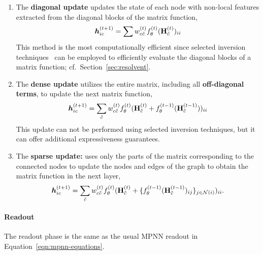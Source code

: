 \documentclass{article} \usepackage{iclr2024_conference,times}
\begin{document}
\begin{enumerate}[leftmargin=1cm]
    \item The \textbf{diagonal update} updates the state of each node with non-local features extracted from the diagonal blocks of the matrix function, 
    \begin{equation}
    \label{eq:update}
        \bm{h}^{(t+1)}_{ic} = \sum w_{c\tilde{c}}^{(t)} f_{\theta}^{(t)}({\bf H}^{(t)}_{\tilde{c}})_{ii}
    \end{equation}
This method is the most computationally efficient since selected inversion techniques~\citep{pexsi_CMS2009} can be employed to efficiently evaluate the diagonal blocks of a matrix function; cf.~Section~\ref{sec:resolvent}. 
    \item The \textbf{dense update} utilizes the entire matrix, including all \textbf{off-diagonal terms}, to update the next matrix function, 
\begin{equation}
    \label{eq:update-full}
        \bm{h}^{(t+1)}_{ic} = \sum_{\tilde{c}} w_{c\tilde{c}}^{(t)} f_{\theta}^{(t)}({\bf H}^{(t)}_{\tilde{c}} + f_{\theta}^{(t-1)}({\bf H}^{(t-1)}_{\tilde{c}}))_{ii}
    \end{equation}
This update can not be performed using selected inversion techniques, but it can offer additional expressiveness guarantees.
    \item The \textbf{sparse update:} uses only the parts of the matrix corresponding to the connected nodes to update the nodes and edges of the graph to obtain the matrix function in the next layer, 
    \begin{equation}
    \label{eq:update-sparse}
        \bm{h}^{(t+1)}_{ic} = \sum_{\tilde{c}} w_{c\tilde{c}}^{(t)} f_{\theta}^{(t)}({\bf H}^{(t)}_{\tilde{c}} + \{ f_{\theta}^{(t-1)}({\bf H}^{(t-1)}_{\tilde{c}})_{ij} \}_{j \in \mathcal{N}(i)})_{ii}.
    \end{equation}
\end{enumerate}
\paragraph{Readout}
The readout phase is the same as the usual MPNN readout in Equation~\ref{eqn:mpnn-equations}.
\end{document}
